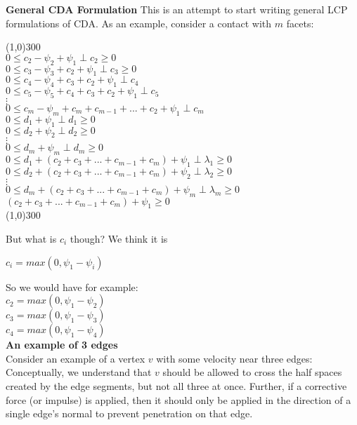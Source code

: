 \documentclass{article}
\begin{document}
\newpage
\textbf{General CDA Formulation}
This is an attempt to start writing general LCP formulations of CDA.  As an example, consider a contact with $m$ facets:
\begin{center}
\line(1,0){300}  \\
$ 0 \leq c_2 - \psi_2 + \psi_1 \perp c_2 \geq 0 $ \\
$ 0 \leq c_3 - \psi_3 + c_2 + \psi_1 \perp c_3 \geq 0 $ \\ 
$ 0 \leq c_4 - \psi_4 + c_3 + c_2 + \psi_1 \perp c_4 $ \\
$ 0 \leq c_5 - \psi_5 + c_4 + c_3 + c_2 + \psi_1 \perp c_5  $ \\
$\vdots$ \\
$ 0 \leq c_m - \psi_m + c_m + c_{m-1} + ... + c_2  + \psi_1 \perp c_m$  \\ \vspace{8mm}
$ 0 \leq d_1 + \psi_1 \perp d_1 \geq 0 $ \\
$ 0 \leq d_2 + \psi_2 \perp d_2 \geq 0 $ \\
$\vdots$ \\
$ 0 \leq d_m + \psi_m \perp d_m \geq 0 $ \\ \vspace{8mm}
$ 0 \leq d_1 + (c_2 + c_3 + ... + c_{m-1} + c_m) + \psi_1 \perp \lambda_1 \geq 0 $ \\
$ 0 \leq d_2 + (c_2 + c_3 + ... + c_{m-1} + c_m) + \psi_2 \perp \lambda_2 \geq 0 $ \\
$\vdots$ \\
$ 0 \leq d_m + (c_2 + c_3 + ... + c_{m-1} + c_m) + \psi_m \perp \lambda_m \geq 0 $ \\ \vspace{8mm}
$ (c_2 + c_3 + ... + c_{m-1} + c_m) + \psi_1 \geq 0 $ \\
\line(1,0){300}  
\end{center}
But what is $c_i$ though?  We think it is
\begin{center}  $c_i = max(0,\psi_1 - \psi_i) $ \end{center}
So we would have for example: \\
$c_2 = max(0, \psi_1 - \psi_2)$ \\
$c_3 = max(0, \psi_1 - \psi_3)$ \\
$c_4 = max(0, \psi_1 - \psi_4)$ \\

\newpage
\textbf{An example of 3 edges} \\
Consider an example of a vertex $v$ with some velocity near three edges: 
Conceptually, we understand that $v$ should be allowed to cross the half spaces created by the edge segments, but not all three at once.  Further, if a corrective force (or impulse) is applied, then it should only be applied in the direction of a single edge's normal to prevent penetration on that edge.
\end{document}
